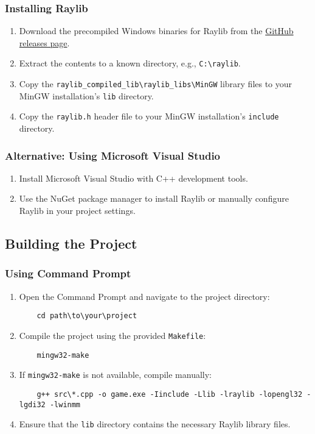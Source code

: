 \documentclass{article}
\begin{document}
\subsubsection{Installing Raylib}

\begin{enumerate}
    \item Download the precompiled Windows binaries for Raylib from the \href{https://github.com/raysan5/raylib/releases}{GitHub releases page}.
    \item Extract the contents to a known directory, e.g., \texttt{C:\textbackslash raylib}.
    \item Copy the \texttt{raylib\_compiled\_lib\textbackslash raylib\_libs\textbackslash MinGW} library files to your MinGW installation's \texttt{lib} directory.
    \item Copy the \texttt{raylib.h} header file to your MinGW installation's \texttt{include} directory.
\end{enumerate}

\subsubsection{Alternative: Using Microsoft Visual Studio}

\begin{enumerate}
    \item Install Microsoft Visual Studio with C++ development tools.
    \item Use the NuGet package manager to install Raylib or manually configure Raylib in your project settings.
\end{enumerate}

\subsection{Building the Project}

\subsubsection{Using Command Prompt}

\begin{enumerate}
    \item Open the Command Prompt and navigate to the project directory:
    \begin{lstlisting}
    cd path\to\your\project
    \end{lstlisting}
    \item Compile the project using the provided \texttt{Makefile}:
    \begin{lstlisting}
    mingw32-make
    \end{lstlisting}
    \item If \texttt{mingw32-make} is not available, compile manually:
    \begin{lstlisting}
    g++ src\*.cpp -o game.exe -Iinclude -Llib -lraylib -lopengl32 -lgdi32 -lwinmm
    \end{lstlisting}
    \item Ensure that the \texttt{lib} directory contains the necessary Raylib library files.
\end{enumerate}
\end{document}
